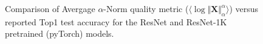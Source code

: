 \begin{figure}[t]
    \centering

    \caption{Comparison of Avergage $\alpha$-Norm quality metric ($\langle\log\Vert\mathbf{X}\Vert_{\alpha}^{\alpha}\rangle$) versus reported Top1 test accuracy for the ResNet and ResNet-1K pretrained (pyTorch) models. }
    \label{fig:cv2-accuracy}
\end{figure}




